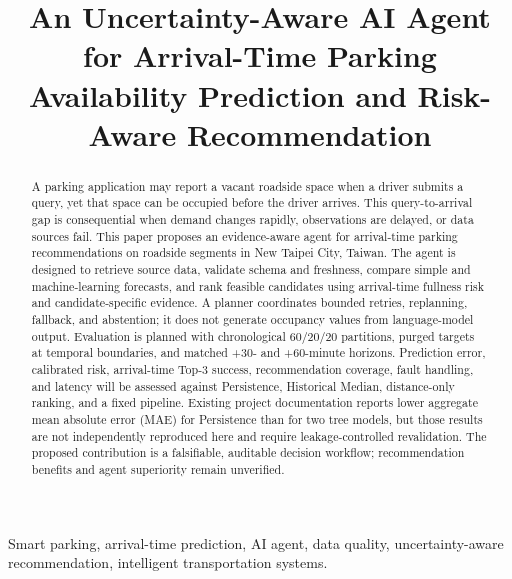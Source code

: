 \documentclass[conference,letterpaper,10pt]{IEEEtran}
\begin{document}
\title{An Uncertainty-Aware AI Agent for Arrival-Time Parking Availability Prediction and Risk-Aware Recommendation}

\author{
}

\maketitle

\begin{abstract}
A parking application may report a vacant roadside space when a driver submits a query, yet that space can be occupied before the driver arrives. This query-to-arrival gap is consequential when demand changes rapidly, observations are delayed, or data sources fail. This paper proposes an evidence-aware agent for arrival-time parking recommendations on roadside segments in New Taipei City, Taiwan. The agent is designed to retrieve source data, validate schema and freshness, compare simple and machine-learning forecasts, and rank feasible candidates using arrival-time fullness risk and candidate-specific evidence. A planner coordinates bounded retries, replanning, fallback, and abstention; it does not generate occupancy values from language-model output. Evaluation is planned with chronological 60/20/20 partitions, purged targets at temporal boundaries, and matched +30- and +60-minute horizons. Prediction error, calibrated risk, arrival-time Top-3 success, recommendation coverage, fault handling, and latency will be assessed against Persistence, Historical Median, distance-only ranking, and a fixed pipeline. Existing project documentation reports lower aggregate mean absolute error (MAE) for Persistence than for two tree models, but those results are not independently reproduced here and require leakage-controlled revalidation. The proposed contribution is a falsifiable, auditable decision workflow; recommendation benefits and agent superiority remain unverified.
\end{abstract}

\begin{IEEEkeywords}
Smart parking, arrival-time prediction, AI agent, data quality, uncertainty-aware recommendation, intelligent transportation systems.
\end{IEEEkeywords}
\end{document}
